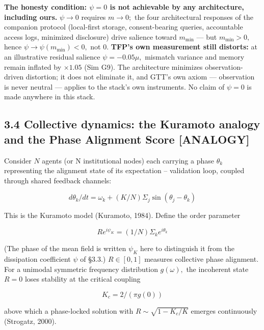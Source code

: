 \documentclass[11pt,twocolumn]{article}
\theoremstyle{gttdef}
\theoremstyle{gttplain}
\begin{document}
\textbf{The honesty condition: $\psi = 0$ is not achievable by any architecture, including ours.} $\psi \to 0$ requires $m \to 0;$ the four architectural responses of the companion protocol (local-first storage, consent-bearing queries, accountable access logs, minimized disclosure) drive salience toward $m_{\min}$ --- but $m_{\min} > 0,$ hence $\psi \to \psi(m_{\min}) < 0,$ not 0. \textbf{TFP's own measurement still distorts:} at an illustrative residual salience $\psi = -0.05\mu,$ mismatch variance and memory remain inflated by $\times1.05$ (Sim G9). The architecture minimizes observation-driven distortion; it does not eliminate it, and GTT's own axiom --- observation is never neutral --- applies to the stack's own instruments. No claim of $\psi = 0$ is made anywhere in this stack.

\subsection*{3.4 Collective dynamics: the Kuramoto analogy and the Phase Alignment Score [ANALOGY]}

Consider $N$ agents (or N institutional nodes) each carrying a phase $\theta_k$ representing the alignment state of its expectation -- validation loop, coupled through shared feedback channels:

\begin{equation}
d\theta_k/dt = \omega_k + (K/N) \Sigma_j \sin(\theta_j - \theta_k)
\label{eq:kuramoto}
\end{equation}

This is the Kuramoto model (Kuramoto, 1984). Define the order parameter

\begin{equation}
R e^{i\psi_K} = (1/N) \Sigma_k e^{i\theta_k}
\label{eq:order}
\end{equation}

(The phase of the mean field is written $\psi_K$ here to distinguish it from the dissipation coefficient $\psi$ of \S{}3.3.) $R \in [0, 1]$ measures collective phase alignment. For a unimodal symmetric frequency distribution $g(\omega),$ the incoherent state $R = 0$ loses stability at the critical coupling

\begin{equation}
K_c = 2 / (\pi g(0))
\label{eq:kc}
\end{equation}

above which a phase-locked solution with $R \sim \sqrt{1 - K_c/K}$ emerges continuously (Strogatz, 2000).
\end{document}
